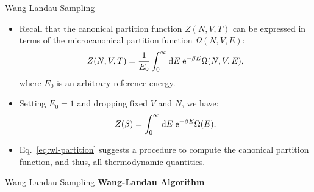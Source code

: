 \documentclass[10pt]{beamer}
\begin{document}
\begin{frame}{Wang-Landau Sampling}
\begin{itemize}
\setlength\itemsep{1em}
  \item Recall that the canonical partition function $Z(N,V,T)$ can be expressed in terms of the microcanonical partition function $\Omega(N,V,E)$:
  \begin{equation}
    Z(N,V,T) = \frac{1}{E_0} \int_0^\infty \mathrm{d} E\; \mathrm{e}^{-\beta E} \Omega(N,V,E),
  \end{equation}
  where $E_0$ is an arbitrary reference energy.

  \item Setting $E_0=1$ and dropping fixed $V$ and $N$, we have:
  \begin{equation}
  \label{eq:wl-partition}
    Z(\beta) = \int_0^\infty \mathrm{d} E\; \mathrm{e}^{-\beta E}\Omega(E).
  \end{equation}

  \item Eq.~\ref{eq:wl-partition} suggests a procedure to compute the canonical partition function, and thus, all thermodynamic quantities.

  \end{itemize}
\end{frame}

\begin{frame}{Wang-Landau Sampling}
\textbf{Wang-Landau Algorithm}
\vspace{0.2cm}
\end{frame}
\end{document}
